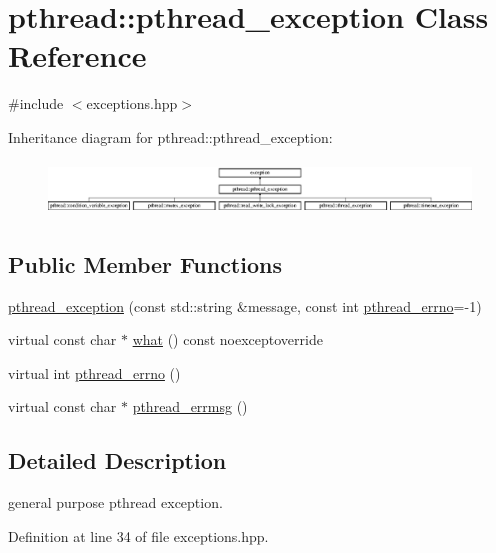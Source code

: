 \hypertarget{classpthread_1_1pthread__exception}{\section{pthread\+:\+:pthread\+\_\+exception Class Reference}
\label{classpthread_1_1pthread__exception}
}


{\ttfamily \#include $<$exceptions.\+hpp$>$}

Inheritance diagram for pthread\+:\+:pthread\+\_\+exception\+:\begin{figure}[H]
\begin{center}
\leavevmode
\includegraphics[height=1.435897cm]{classpthread_1_1pthread__exception}
\end{center}
\end{figure}
\subsection*{Public Member Functions}
\begin{DoxyCompactItemize}
\item 
\hyperlink{classpthread_1_1pthread__exception_ac52d5b544f7b86bed738afd2a5f11473}{pthread\+\_\+exception} (const std\+::string \&message, const int \hyperlink{classpthread_1_1pthread__exception_a4a869173054faca1945ac1a7729082d6}{pthread\+\_\+errno}=-\/1)
\item 
virtual const char $\ast$ \hyperlink{classpthread_1_1pthread__exception_ae54eed6aa72bac1c503554ddd857e466}{what} () const noexceptoverride
\item 
virtual int \hyperlink{classpthread_1_1pthread__exception_a4a869173054faca1945ac1a7729082d6}{pthread\+\_\+errno} ()
\item 
virtual const char $\ast$ \hyperlink{classpthread_1_1pthread__exception_afc17488e8f6160865f1beb4d6fc20d2a}{pthread\+\_\+errmsg} ()
\end{DoxyCompactItemize}


\subsection{Detailed Description}
general purpose pthread exception. 

Definition at line 34 of file exceptions.\+hpp.




